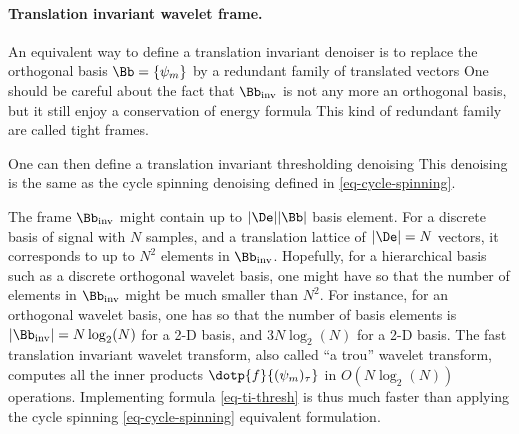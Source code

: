 


\paragraph{Translation invariant wavelet frame.}

An equivalent way to define a translation invariant denoiser is to replace the orthogonal basis $\Bb = \{\psi_m\}$ by a redundant family of translated vectors
One should be careful about the fact that $\Bb_{\text{inv}}$ is not any more an orthogonal basis, but it still enjoy a conservation of energy formula
This kind of redundant family are called tight frames. 

One can then define a translation invariant thresholding denoising
This denoising is the same as the cycle spinning denoising defined in \eqref{eq-cycle-spinning}.

The frame $\Bb_{\text{inv}}$ might contain up to $|\De| |\Bb|$ basis element. 
For a discrete basis of signal with $N$ samples, and a translation lattice of $|\De|=N$ vectors, it corresponds to up to $N^2$ elements in $\Bb_{\text{inv}}$. Hopefully, for a hierarchical basis such as a discrete orthogonal wavelet basis, one might have 
so that the number of elements in $\Bb_{\text{inv}}$ might be much smaller than $N^2$. 
For instance, for an orthogonal wavelet basis, one has
so that the number of basis elements is $|\Bb_{\text{inv}}| = N \log_2(N)$ for a 2-D basis, and $3 N \log_2(N)$ for a 2-D basis. The fast translation invariant wavelet transform, also called ``a trou'' wavelet transform, computes all the inner products $\dotp{f}{(\psi_m)_\tau}$ in $O(N \log_2(N))$ operations. Implementing formula \eqref{eq-ti-thresh} is thus much faster than applying the cycle spinning \eqref{eq-cycle-spinning} equivalent formulation.

